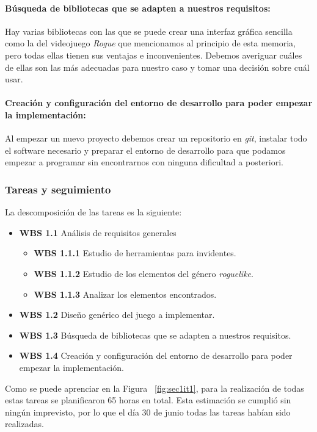 \paragraph{Búsqueda de bibliotecas que se adapten a nuestros requisitos:} Hay varias bibliotecas con las que se puede crear una interfaz gráfica sencilla como la del videojuego \textit{Rogue} que mencionamos al principio de esta memoria, pero todas ellas tienen sus ventajas e inconvenientes. Debemos averiguar cuáles de ellas son las más adecuadas para nuestro caso y tomar una decisión sobre cuál usar.

\paragraph{Creación y configuración del entorno de desarrollo para poder empezar la implementación:} Al empezar un nuevo proyecto debemos crear un repositorio en \textit{git}, instalar todo el software necesario y preparar el entorno de desarrollo para que podamos empezar a programar sin encontrarnos con ninguna dificultad a posteriori.

\subsubsection{Tareas y seguimiento}

La descomposición de las tareas es la siguiente:

\begin{itemize}
  \item \textbf{WBS 1.1} Análisis de requisitos generales
    \begin{itemize}
      \item \textbf{WBS 1.1.1} Estudio de herramientas para invidentes.
      \item \textbf{WBS 1.1.2} Estudio de los elementos del género \textit{roguelike}.
      \item \textbf{WBS 1.1.3} Analizar los elementos encontrados.
    \end{itemize}
  \item \textbf{WBS 1.2} Diseño genérico del juego a implementar.
  \item \textbf{WBS 1.3} Búsqueda de bibliotecas que se adapten a nuestros requisitos.
  \item \textbf{WBS 1.4} Creación y configuración del entorno de desarrollo para poder empezar la implementación.
\end{itemize}

\noindent Como se puede aprenciar en la Figura ~\ref{fig:sec1it1}, para la realización de todas estas tareas se planificaron 65 horas en total. Esta estimación se cumplió sin ningún imprevisto, por lo que el día 30 de junio todas las tareas habían sido realizadas.

